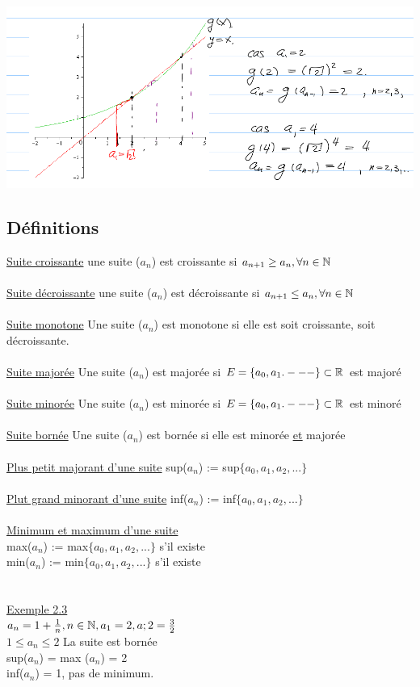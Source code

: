 \documentclass[12pt,a4paper]{article}
\begin{document}
{\begin{itemize}
\includegraphics[scale=0.5]{illustrations_Analyse/sqrt2}
\end{itemize}
\subsection{Définitions}
\underline{Suite croissante} une suite ($a_n$) est croissante si $a_{n+1} \geq a_n, \forall n \in \mathbb{N}$\\
\\
\underline{Suite décroissante} une suite ($a_n$) est décroissante si $a_{n+1} \leq a_n, \forall n \in \mathbb{N}$\\
\\
\underline{Suite monotone} Une suite ($a_n$) est monotone si elle est soit croissante, soit décroissante.\\
\\
\underline{Suite majorée} Une suite ($a_n$) est majorée si $E = \{a_0,a_1.---\} \subset \mathbb{R}$ est majoré\\
\\
\underline{Suite minorée} Une suite ($a_n$) est minorée si $E = \{a_0,a_1.---\} \subset \mathbb{R}$ est minoré\\
\\
\underline{Suite bornée} Une suite ($a_n$) est bornée si elle est minorée \underline{\underline{et}} majorée\\
\\
\underline{Plus petit majorant d'une suite} sup($a_n$) := sup$\{a_0,a_1,a_2,...\}$\\
\\
\underline{Plut grand minorant d'une suite} inf($a_n$) := inf$\{a_0,a_1,a_2,...\}$\\
\\
\underline{Minimum et maximum d'une suite}\\
max($a_n$) := max$\{a_0,a_1,a_2,...\}$ s'il existe\\
min($a_n$) := min$\{a_0,a_1,a_2,...\}$ s'il existe\\
\\
\\
\underline{Exemple 2.3}\\
$a_n = 1+ \frac{1}{n}, n \in \mathbb{N}
, a_1 = 2, a;2 = \frac{3}{2}$\\
$1\leq a_n \leq 2$ La suite est bornée\\
sup($a_n$) = max ($a_n$) = 2\\
inf($a_n$) = 1, pas de minimum.

}
\end{document}
